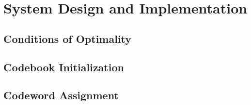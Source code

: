 \documentclass[10pt]{article}
\begin{document}
\section{System Design and Implementation}
\subsection{Conditions of Optimality}




\subsection{Codebook Initialization}



\subsection{Codeword Assignment}
\end{document}
